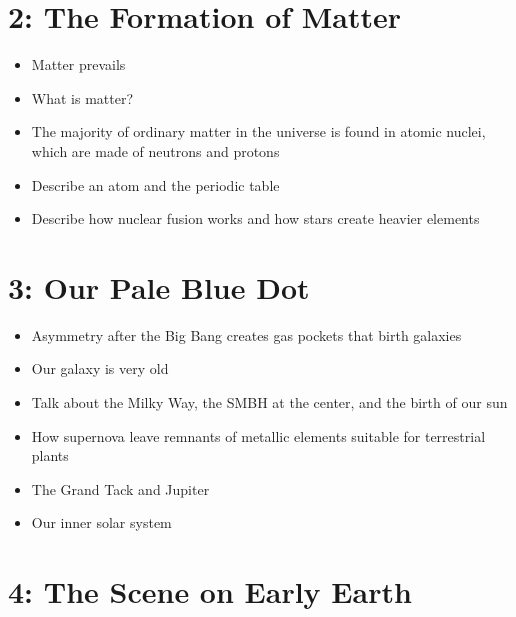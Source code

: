 \documentclass[
]{report}
\providecommand{\tightlist}{%
  \setlength{\itemsep}{0pt}\setlength{\parskip}{0pt}}
\providecommand{\tightlist}{%
  \setlength{\itemsep}{0pt}\setlength{\parskip}{0pt}}
\begin{document}
\hypertarget{the-formation-of-matter}{%
\section*{2: The Formation of Matter}\label{the-formation-of-matter}}

\begin{itemize}
\tightlist
\item
  Matter prevails
\item
  What is matter?
\item
  The majority of ordinary matter in the universe is found in atomic nuclei, which are made of neutrons and protons
\item
  Describe an atom and the periodic table
\item
  Describe how nuclear fusion works and how stars create heavier elements
\end{itemize}

\hypertarget{our-pale-blue-dot}{%
\section*{3: Our Pale Blue Dot}\label{our-pale-blue-dot}}

\begin{itemize}
\tightlist
\item
  Asymmetry after the Big Bang creates gas pockets that birth galaxies
\item
  Our galaxy is very old
\item
  Talk about the Milky Way, the SMBH at the center, and the birth of our sun
\item
  How supernova leave remnants of metallic elements suitable for terrestrial plants
\item
  The Grand Tack and Jupiter
\item
  Our inner solar system
\end{itemize}

\hypertarget{the-scene-on-early-earth}{%
\section*{4: The Scene on Early Earth}\label{the-scene-on-early-earth}}
\end{document}
